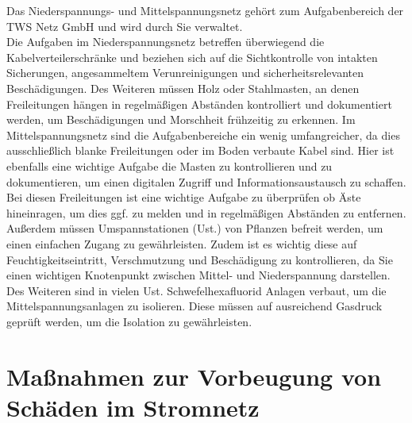 Das Niederspannungs- und Mittelspannungsnetz gehört zum Aufgabenbereich der TWS Netz GmbH und wird durch Sie verwaltet. \autocite{Schwab.2012} 
\\
Die Aufgaben im Niederspannungsnetz betreffen überwiegend die Kabelverteilerschränke und beziehen sich auf die Sichtkontrolle von intakten Sicherungen, 
angesammeltem Verunreinigungen und sicherheitsrelevanten Beschädigungen. Des Weiteren müssen Holz oder Stahlmasten, an denen Freileitungen hängen in 
regelmäßigen Abständen kontrolliert und dokumentiert werden, um Beschädigungen und Morschheit frühzeitig zu erkennen. Im Mittelspannungsnetz sind die 
Aufgabenbereiche ein wenig umfangreicher, da dies ausschließlich blanke Freileitungen oder im Boden verbaute Kabel sind. Hier ist ebenfalls eine wichtige 
Aufgabe die Masten zu kontrollieren und zu dokumentieren, um einen digitalen Zugriff und Informationsaustausch zu schaffen. Bei diesen Freileitungen ist 
eine wichtige Aufgabe zu überprüfen ob Äste hineinragen, um dies ggf. zu melden und in regelmäßigen Abständen zu entfernen. Außerdem müssen Umspannstationen 
(Ust.) von Pflanzen befreit werden, um einen einfachen Zugang zu gewährleisten. Zudem ist es wichtig diese auf Feuchtigkeitseintritt, Verschmutzung und 
Beschädigung zu kontrollieren, da Sie einen wichtigen Knotenpunkt zwischen Mittel- und Niederspannung darstellen. Des Weiteren sind in vielen Ust. 
Schwefelhexafluorid  Anlagen verbaut, um die Mittelspannungsanlagen zu isolieren. Diese müssen auf ausreichend Gasdruck geprüft werden, um die 
Isolation zu gewährleisten.
\clearpage

\section{Maßnahmen zur Vorbeugung von Schäden im Stromnetz}

